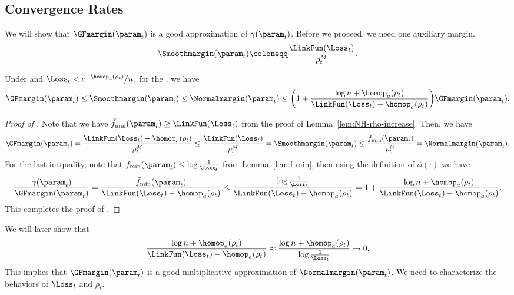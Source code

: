 \subsection{Convergence Rates} \label{sec:proof:rates}

We will show that $\GFmargin(\param_t)$ is a good approximation of $\gamma(\param_t)$. Before we proceed, we need one auxiliary margin. 
\begin{equation}
\label{eq:smooth-margin}
        \Smoothmargin(\param_t) \coloneqq \frac{\LinkFun(\Loss_t)}{\rho_t^M}.
\end{equation}


\begin{lemma}
    \label{lem:gamma-approx}
    Under  and $\Loss_t < e^{-\homop_a(\rho_t)}/n$, for the , we have 
    \[
        \GFmargin (\param_t) \le \Smoothmargin(\param_t) \le \Normalmargin(\param_t)\le \bigg ( 1+ \frac{\log n + \homop_a(\rho_t)}{\LinkFun(\Loss_t) -\homop_a(\rho_t)} \bigg) \GFmargin(\param_t).
    \]
\end{lemma}
\begin{proof}[Proof of ]
Note that we have $\bar f_{\min}(\param_t) \ge \LinkFun(\Loss_t)$ from the proof of Lemma~\ref{lem:NH-rho-increase}. Then, we have 
\[
    \GFmargin (\param_t) = \frac{\LinkFun(\Loss_t) - \homop_a(\rho_t)}{\rho_t^M} \le \frac{\LinkFun(\Loss_t)}{\rho_t^M} = \Smoothmargin(\param_t) \le \frac{\bar f_{\min}(\param_t)}{\rho_t^M} = \Normalmargin (\param_t).
\]
For the last inequality, note that $\bar f_{\min}(\param_t) \le \log \frac{1}{\Loss_t}$ from Lemma~\ref{lem:f-min}, then using the definition of $\phi(\cdot)$ we have
\begin{align*}
    \frac{\gamma(\param_t)}{\GFmargin(\param_t)} 
    = \frac{\bar f_{\min}(\param_t)}{\LinkFun(\Loss_t) - \homop_a(\rho_t)} 
    \le \frac{ \log \frac{1}{\Loss_t}}{\LinkFun(\Loss_t) - \homop_a(\rho_t)}
    = 1 + \frac{\log n + \homop_a(\rho_t)}{\LinkFun(\Loss_t) -\homop_a(\rho_t)}.
\end{align*}
This completes the proof of . 
\end{proof}
We will later show that 
\[
    \frac{\log n + \homop_a(\rho_t)}{\LinkFun(\Loss_t) -\homop_a(\rho_t)} \approx \frac{\log n + \homop_a(\rho_t)}{\log \frac{1}{\Loss_t}} \to 0.
\] 
This implies that $\GFmargin(\param_t)$ is a good multiplicative approximation of $\Normalmargin(\param_t)$. We need to characterize the behaviors of $\Loss_t$ and $\rho_t$.  

